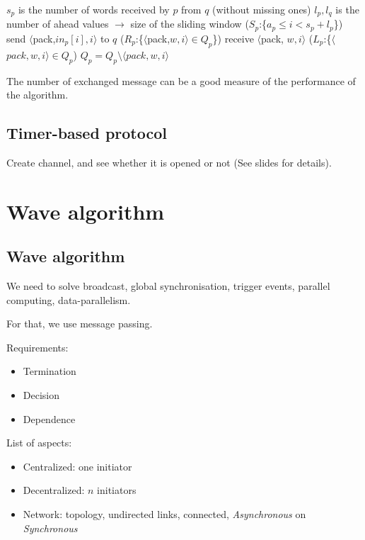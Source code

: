 \documentclass{article}
\newcommand\tok[1]{$\langle$#1$\rangle$}
\begin{document}
\begin{algorithm}
\Var
$s_p$ is the number of words received by $p$ from $q$ (without missing ones)\;
$l_p, l_q$ is the number of ahead values $\to$ size of the sliding window\;
\Label($S_p$:\{$a_p\leq i < s_p+l_p$\}){
	send \tok{pack,$in_p[i],i$} to $q$\;
}
\Label($R_p$:\{\tok{pack,$w,i$}$\in Q_p$\}){
	receive \tok{pack, $w,i$}\;
}
\Label($L_p$:\{\tok{$pack,w,i$}$\in Q_p$){
	$Q_p=Q_p\setminus$\tok{$pack,w,i$}\;
}
\end{algorithm}

The number of exchanged message can be a good measure of the performance of the algorithm.
\clearpage

\subsection{Timer-based protocol}

Create channel, and see whether it is opened or not (See slides for details).


\section{Wave algorithm}
\subsection{Wave algorithm}
We need to solve broadcast, global synchronisation, trigger events, parallel computing, data-parallelism.

For that, we use message passing.

Requirements:
\begin{itemize}
\item Termination
\item Decision
\item Dependence
\end{itemize}
\bigskip

List of aspects:
\begin{itemize}
\item Centralized: one initiator
\item Decentralized: $n$ initiators
\item Network: topology, undirected links, connected, \emph{Asynchronous} on \emph{Synchronous}
\end{itemize}
\bigskip
\end{document}
